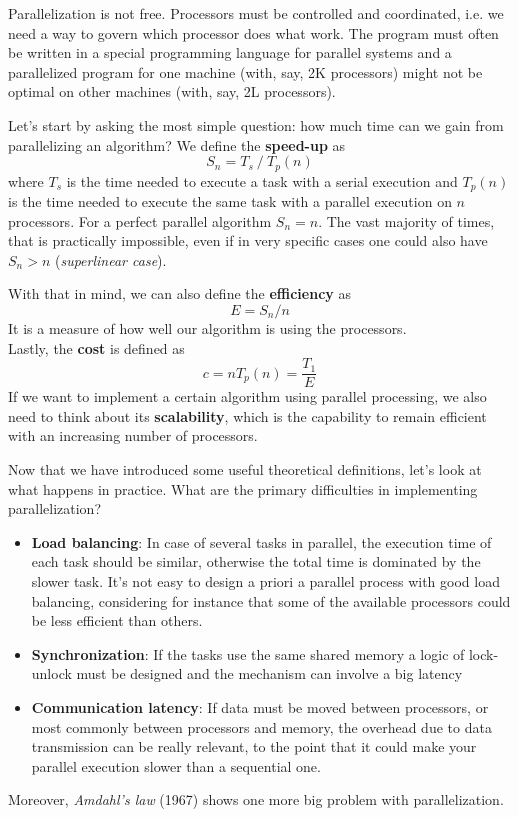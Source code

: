 Parallelization is not free. Processors must be controlled and coordinated, i.e. we need a way to govern which processor does what work. The program must often be written in a special programming language for parallel systems and a parallelized program for one machine (with, say, 2K processors) might not be optimal on other machines (with, say, 2L processors).

Let's start by asking the most simple question: how much time can we gain from parallelizing an algorithm?
We define the \textbf{speed-up} as 
\begin{equation*}
    S_{n}=T_{s}  \ / \ T_{p}(n)    
\end{equation*}
where $T_{s}$ is the time needed to execute a task with a serial execution and $T_{p}(n)$ is the time needed to execute the same task with a parallel execution on $n$ processors. 
For a perfect parallel algorithm $S_{n}=n$. The vast majority of times, that is practically impossible, even if in very specific cases one could also have $S_{n}>n$ (\textit{superlinear case}).

With that in mind, we can also define the \textbf{efficiency} as 
\begin{equation*}
    E=S_{n}/n
\end{equation*}
It is a measure of how well our algorithm is using the processors. \\
Lastly, the \textbf{cost} is defined as
\begin{equation*}
    c=nT_{p}(n)=\frac{T_{1}}{E}
\end{equation*}
If we want to implement a certain algorithm using parallel processing, we also need to think about its \textbf{scalability}, which is the capability to remain efficient with an increasing number of processors.

Now that we have introduced some useful theoretical definitions, let's look at what happens in practice. What are the primary difficulties in implementing parallelization?
\begin{itemize}
    \item[-] \textbf{Load balancing}: In case of several tasks in parallel, the execution time of each task should be similar, otherwise the total time is dominated by the slower task. It's not easy to design a priori a parallel process with good load balancing, considering for instance that some of the available processors could be less efficient than others.
    \item[-] \textbf{Synchronization}: If the tasks use the same shared memory a logic of lock-unlock must be designed and the mechanism can involve a big latency
    \item[-] \textbf{Communication latency}: If data must be moved between processors, or most commonly between processors and memory, the overhead due to data transmission can be really relevant, to the point that it could make your parallel execution slower than a sequential one.
\end{itemize}
Moreover, \textit{Amdahl's law} (1967) shows one more big problem with parallelization. 

